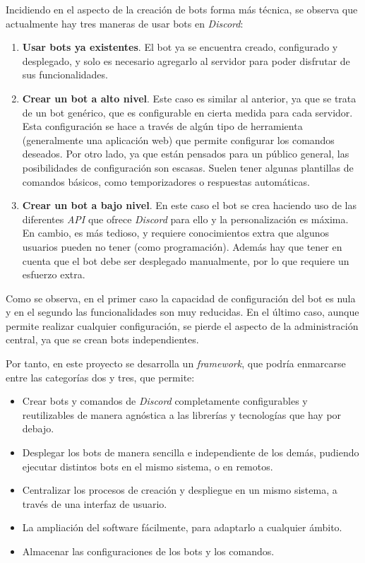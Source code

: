 Incidiendo en el aspecto de la creación de bots forma más técnica, se observa que actualmente hay tres maneras de usar bots en \textit{Discord}:

\begin{enumerate}
	\item \textbf{Usar bots ya existentes}. El bot ya se encuentra creado, configurado y desplegado, y solo es necesario agregarlo al servidor para poder disfrutar de sus funcionalidades.
	\item \textbf{Crear un bot a alto nivel}. Este caso es similar al anterior, ya que se trata de un bot genérico, que es configurable en cierta medida para cada servidor. Esta configuración se hace a través de algún tipo de herramienta (generalmente una aplicación web) que permite configurar los comandos deseados. Por otro lado, ya que están pensados para un público general, las posibilidades de configuración son escasas. Suelen tener algunas plantillas de comandos básicos, como temporizadores o respuestas automáticas.
	\item \textbf{Crear un bot a bajo nivel}. En este caso el bot se crea haciendo uso de las diferentes \textit{API} que ofrece \textit{Discord} para ello y la personalización es máxima. En cambio, es más tedioso, y requiere conocimientos extra que algunos usuarios pueden no tener (como programación). Además hay que tener en cuenta que el bot debe ser desplegado manualmente, por lo que requiere un esfuerzo extra.
\end{enumerate}

Como se observa, en el primer caso la capacidad de configuración del bot es nula y en el segundo las funcionalidades son muy reducidas. En el último caso, aunque permite realizar cualquier configuración, se pierde el aspecto de la administración central, ya que se crean bots independientes. 

Por tanto, en este proyecto se desarrolla un \textit{framework}, que podría enmarcarse entre las categorías dos y tres, que permite:

\begin{itemize}
	\item Crear bots y comandos de \textit{Discord} completamente configurables y reutilizables de manera agnóstica a las librerías y tecnologías que hay por debajo.
	\item Desplegar los bots de manera sencilla e independiente de los demás, pudiendo ejecutar distintos bots en el mismo sistema, o en remotos.
	\item Centralizar los procesos de creación y despliegue en un mismo sistema, a través de una interfaz de usuario.
	\item La ampliación del software fácilmente, para adaptarlo a cualquier ámbito.
	\item Almacenar las configuraciones de los bots y los comandos.
\end{itemize}
